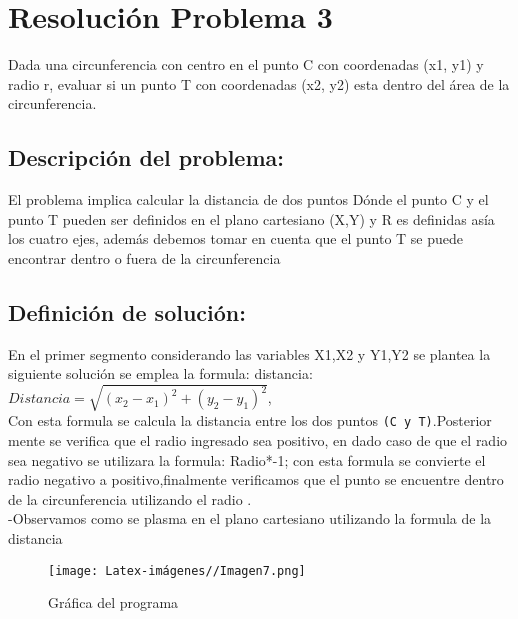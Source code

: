 \section{Resolución Problema 3}
Dada una circunferencia con centro en el punto
C con coordenadas (x1, y1) y radio r, evaluar si
un punto T con coordenadas (x2, y2) esta dentro
del área de la circunferencia.


\subsection{\textbf{Descripción del problema:}}
El problema implica calcular la distancia de dos puntos 
Dónde el punto C y el punto T pueden ser definidos en el plano cartesiano (X,Y) y R es definidas asía los cuatro ejes, además debemos tomar en cuenta que el punto T se puede encontrar dentro o fuera de la circunferencia 


\subsection{\textbf{Definición de solución:}}
En el primer segmento considerando las variables X1,X2 y Y1,Y2 se plantea la siguiente solución se emplea la formula: distancia:
\\
${Distancia} = \sqrt{{(x_2 - x_1)^2 + (y_2 - y_1)^2}}$,
\\
Con esta formula se calcula la distancia entre los dos puntos  \texttt{(C y T)}.Posterior mente se verifica que el radio ingresado sea positivo, en dado caso de que el radio sea negativo se utilizara la formula: Radio*-1; con esta formula se convierte el radio negativo a positivo,finalmente verificamos que el punto se encuentre dentro de la circunferencia utilizando el radio . 
\\
-Observamos como se plasma en el plano cartesiano utilizando la formula de la distancia
\begin{figure}[H]
    \centering
    \texttt{[image: Latex-imágenes//Imagen7.png]}
    \caption{Gráfica del programa}
    \label{fig:imagen7}
\end{figure}


